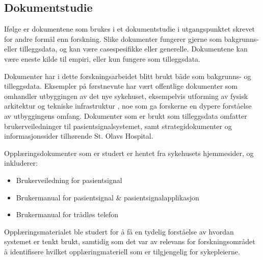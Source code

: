 \subsection{Dokumentstudie}
\label{sec:dokumentstudie}
Ifølge \citet{Tjora} er dokumentene som brukes i et dokumentstudie i utgangspunktet skrevet for andre formål enn forskning. Slike dokumenter fungerer gjerne som bakgrunns- eller tilleggsdata, og kan være casespesifikke eller generelle. Dokumentene kan være eneste kilde til empiri, eller kun fungere som tilleggsdata. 

\noindent
Dokumenter har i dette forskningsarbeidet blitt brukt både som bakgrunns- og tilleggsdata. Eksempler på førstnevnte har vært offentlige dokumenter som omhandler utbyggingen av det nye sykehuset, eksempelvis utforming av fysisk arkitektur \citep{Aslaksen, Sintef-sengetun} og tekniske infrastruktur \citep{TU}, noe som ga forskerne en dypere forståelse av utbyggingens omfang. Dokumenter som er brukt som tilleggsdata omfatter brukerveiledninger til pasientsignalsystemet, samt strategidokumenter og informasjonssider tilhørende St. Olavs Hospital. 

\noindent
Opplæringsdokumenter som er studert er hentet fra sykehusets hjemmesider, og inkluderer:
\begin{itemize}
\item Brukerveiledning for pasientsignal \citep{BrukerveiledningforPasientsignal}
\item Brukermanual for pasientsignal \& pasientsignalapplikasjon \citep{BrukermanualforPasientsignalogPasientsignalapplikasjon}
\item Brukermanual for trådløs telefon \citep{BrukerveiledningforTradlostelefon}
\end{itemize}

\noindent
Opplæringsmaterialet ble studert for å få en tydelig forståelse av hvordan systemet er tenkt brukt, samtidig som det var av relevans for forskningsområdet å identifisere hvilket opplæringmateriell som er tilgjengelig for sykepleierne.